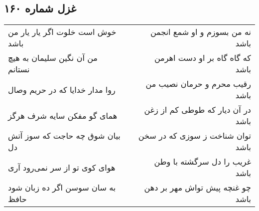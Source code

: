 \begin{center}
\section*{غزل شماره ۱۶۰}
\label{sec:sh160}
\begin{longtable}{l p{0.5cm} r}
خوش است خلوت اگر یار یار من باشد
&&
نه من بسوزم و او شمع انجمن باشد
\\
من آن نگین سلیمان به هیچ نستانم
&&
که گاه گاه بر او دست اهرمن باشد
\\
روا مدار خدایا که در حریم وصال
&&
رقیب محرم و حرمان نصیب من باشد
\\
همای گو مفکن سایه شرف هرگز
&&
در آن دیار که طوطی کم از زغن باشد
\\
بیان شوق چه حاجت که سوز آتش دل
&&
توان شناخت ز سوزی که در سخن باشد
\\
هوای کوی تو از سر نمی‌رود آری
&&
غریب را دل سرگشته با وطن باشد
\\
به سان سوسن اگر ده زبان شود حافظ
&&
چو غنچه پیش تواش مهر بر دهن باشد
\\
\end{longtable}
\end{center}
